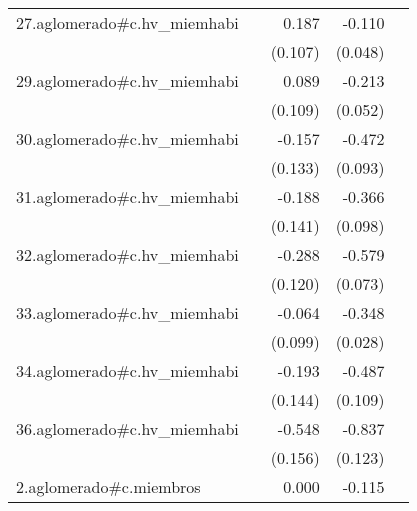 {\begin{longtable}{l*{4}{D{.}{.}{-1}}}
\addlinespace
27.aglomerado#c.hv\_miemhabi&                     &       0.187         &      -0.110\sym{*}  &                     \\
            &                     &     (0.107)         &     (0.048)         &                     \\
\addlinespace
29.aglomerado#c.hv\_miemhabi&                     &       0.089         &      -0.213\sym{***}&                     \\
            &                     &     (0.109)         &     (0.052)         &                     \\
\addlinespace
30.aglomerado#c.hv\_miemhabi&                     &      -0.157         &      -0.472\sym{***}&                     \\
            &                     &     (0.133)         &     (0.093)         &                     \\
\addlinespace
31.aglomerado#c.hv\_miemhabi&                     &      -0.188         &      -0.366\sym{***}&                     \\
            &                     &     (0.141)         &     (0.098)         &                     \\
\addlinespace
32.aglomerado#c.hv\_miemhabi&                     &      -0.288\sym{*}  &      -0.579\sym{***}&                     \\
            &                     &     (0.120)         &     (0.073)         &                     \\
\addlinespace
33.aglomerado#c.hv\_miemhabi&                     &      -0.064         &      -0.348\sym{***}&                     \\
            &                     &     (0.099)         &     (0.028)         &                     \\
\addlinespace
34.aglomerado#c.hv\_miemhabi&                     &      -0.193         &      -0.487\sym{***}&                     \\
            &                     &     (0.144)         &     (0.109)         &                     \\
\addlinespace
36.aglomerado#c.hv\_miemhabi&                     &      -0.548\sym{***}&      -0.837\sym{***}&                     \\
            &                     &     (0.156)         &     (0.123)         &                     \\
\addlinespace
2.aglomerado#c.miembros&                     &       0.000         &      -0.115\sym{***}&                     \\

\end{longtable}}

